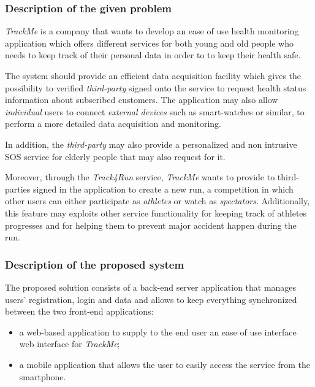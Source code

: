 \documentclass[a4paper]{article}
\begin{document}
        \subsubsection{Description of the given problem}
        \textit{TrackMe} is a company that wants to develop an ease of use health monitoring application which offers different services for both young and old people who needs to keep track of their personal data in order to to keep their health safe.
        
        The system should provide an efficient data acquisition facility which gives the possibility to verified \textit{third-party} signed onto the service to request health status information about subscribed customers. The application may also allow \textit{individual} users to connect \textit{external devices} such as smart-watches or similar, to perform a more detailed data acquisition and monitoring.
        
        In addition, the \textit{third-party} may also provide a personalized and non intrusive SOS service for elderly people that may also request for it.
    
        Moreover, through the \textit{Track4Run} service, \textit{TrackMe} wants to provide to third-parties signed in the application to create a new run, a competition in which other users can either participate as \textit{athletes} or watch as \textit{spectators}. Additionally, this feature may exploits other service functionality for keeping track of athletes progresses and for helping them to prevent major accident happen during the run.
                
        \subsubsection{Description of the proposed system}
        The proposed solution consists of a back-end server application that manages users' registration, login and data and allows to keep everything synchronized between the two front-end applications:
        \begin{itemize}
            \item a web-based application to supply to the end user an ease of use interface web interface for \textit{TrackMe};
            \item a mobile application that allows the user to easily access the service from the smartphone.
        \end{itemize}
        
\end{document}
